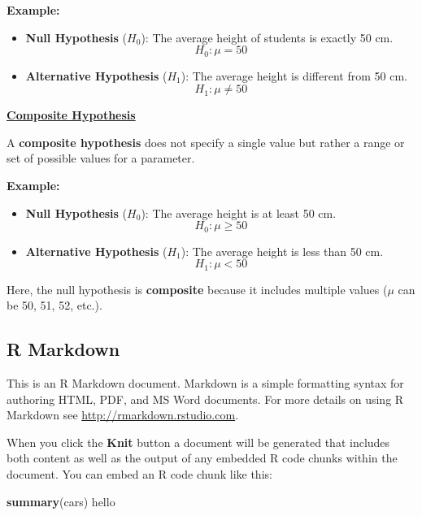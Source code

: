 \documentclass[
]{article}
\newenvironment{Shaded}{\begin{snugshade}}{\end{snugshade}}
\newcommand{\FunctionTok}[1]{\textcolor[rgb]{0.13,0.29,0.53}{\textbf{#1}}}
\newcommand{\NormalTok}[1]{#1}
\begin{document}
\textbf{Example:}

\begin{itemize}
\item
  \textbf{Null Hypothesis} (\(H_0\)): The average height of students is
  exactly 50 cm.\\
  \[
  H_0: \mu = 50
  \]
\item
  \textbf{Alternative Hypothesis} (\(H_1\)): The average height is
  different from 50 cm.\\
  \[
  H_1: \mu \neq 50
  \]
\end{itemize}

\ul{\textbf{Composite Hypothesis}}

A \textbf{composite hypothesis} does not specify a single value but
rather a range or set of possible values for a parameter.

\textbf{Example:}

\begin{itemize}
\item
  \textbf{Null Hypothesis} (\(H_0\)): The average height is at least 50
  cm.\\
  \[
  H_0: \mu \geq 50
  \]
\item
  \textbf{Alternative Hypothesis} (\(H_1\)): The average height is less
  than 50 cm.\\
  \[
  H_1: \mu < 50
  \]
\end{itemize}

Here, the null hypothesis is \textbf{composite} because it includes
multiple values (\(\mu\) can be 50, 51, 52, etc.).

\subsection{R Markdown}\label{r-markdown}

This is an R Markdown document. Markdown is a simple formatting syntax
for authoring HTML, PDF, and MS Word documents. For more details on
using R Markdown see \url{http://rmarkdown.rstudio.com}.

When you click the \textbf{Knit} button a document will be generated
that includes both content as well as the output of any embedded R code
chunks within the document. You can embed an R code chunk like this:

\begin{Shaded}
\begin{Highlighting}[]
\FunctionTok{summary}\NormalTok{(cars)}
\NormalTok{hello}
\end{Highlighting}
\end{Shaded}
\end{document}
